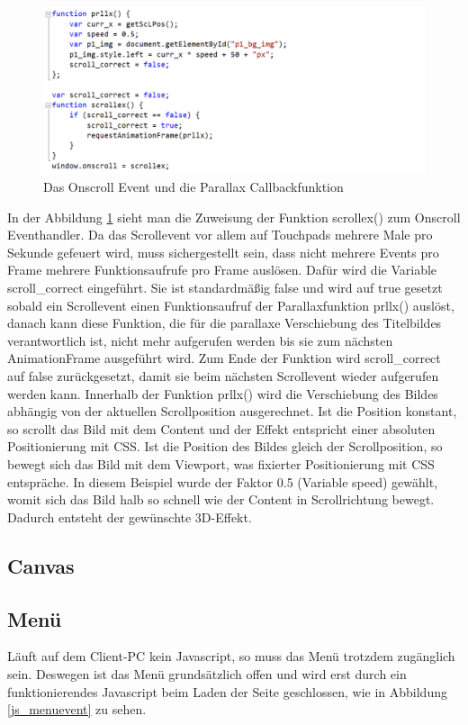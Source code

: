 \begin{figure} [h]
\includegraphics[width=\textwidth]{./img/js_scrollex.png}
\caption{Das Onscroll Event und die Parallax Callbackfunktion}
\label{js_scrollex}
\end{figure}
In der Abbildung \ref{js_scrollex} sieht man die Zuweisung der Funktion scrollex() zum Onscroll Eventhandler. Da das Scrollevent vor allem auf Touchpads mehrere Male pro Sekunde gefeuert wird, muss sichergestellt sein, dass nicht mehrere Events pro Frame mehrere Funktionsaufrufe pro Frame auslösen. Dafür wird die Variable scroll\_correct eingeführt. Sie ist standardmäßig false und wird auf true gesetzt sobald ein Scrollevent einen Funktionsaufruf der Parallaxfunktion prllx() auslöst, danach kann diese Funktion, die für die parallaxe Verschiebung des Titelbildes verantwortlich ist, nicht mehr aufgerufen werden bis sie zum nächsten AnimationFrame ausgeführt wird. Zum Ende der Funktion wird scroll\_correct auf false zurückgesetzt, damit sie beim nächsten Scrollevent wieder aufgerufen werden kann. Innerhalb der Funktion prllx() wird die Verschiebung des Bildes abhängig von der aktuellen Scrollposition ausgerechnet. Ist die Position konstant, so scrollt das Bild mit dem Content und der Effekt entspricht einer absoluten Positionierung mit CSS. Ist die Position des Bildes gleich der Scrollposition, so bewegt sich das Bild mit dem Viewport, was fixierter Positionierung mit CSS entspräche. In diesem Beispiel wurde der Faktor 0.5 (Variable speed) gewählt, womit sich das Bild halb so schnell wie der Content in Scrollrichtung bewegt. Dadurch entsteht der gewünschte 3D-Effekt.




\subsection{Canvas}




\subsection{Menü}
Läuft auf dem Client-PC kein Javascript, so muss das Menü trotzdem zugänglich sein. Deswegen ist das Menü grundsätzlich offen und wird erst durch ein funktionierendes Javascript beim Laden der Seite geschlossen, wie in Abbildung \ref{js_menuevent} zu sehen.

